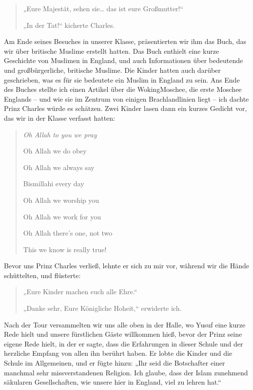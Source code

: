 \documentclass[12pt]{memoir}
\begin{document}
\begin{quote}
„Eure Majestät, sehen sie… das ist eure Großmutter!“

„In der Tat!“ kicherte Charles.
\end{quote}

Am Ende seines Besuches in unserer Klasse,
präsentierten wir ihm das Buch,
das wir über britische Muslime erstellt hatten.
Das Buch enthielt eine kurze Geschichte von Muslimen in England,
und auch Informationen über bedeutende und großbürgerliche, britische Muslime.
Die Kinder hatten auch darüber geschrieben,
was es für sie bedeutete ein Muslim in England zu sein.
Ans Ende des Buches stellte ich einen Artikel über die Woking\–Moschee,
die erste Moschee Englands –
und wie sie im Zentrum von einigen Brachlandlinien liegt –
ich dachte Prinz Charles würde es schätzen.
Zwei Kinder lasen dann ein kurzes Gedicht vor,
das wir in der Klasse verfasst hatten:

\begin{quote}
\itshape
Oh Allah to you we pray

Oh Allah we do obey

Oh Allah we always say

Bismillahi every day

Oh Allah we worship you

Oh Allah we work for you

Oh Allah there’s one, not two

This we know is really true!
\end{quote}

Bevor uns Prinz Charles verließ, lehnte er sich zu mir vor,
während wir die Hände schüttelten, und flüsterte:

\begin{quote}
„Eure Kinder machen euch alle Ehre.“

„Danke sehr, Eure Königliche Hoheit,“ erwiderte ich.
\end{quote}

Nach der Tour versammelten wir uns alle oben in der Halle,
wo Yusuf eine kurze Rede hielt und unsere fürstlichen Gäste willkommen hieß,
bevor der Prinz seine eigene Rede hielt,
in der er sagte, dass die Erfahrungen in dieser Schule
und der herzliche Empfang von allen ihn berührt haben.
Er lobte die Kinder und die Schule im Allgemeinen, und er fügte hinzu:
„Ihr seid die Botschafter einer manchmal sehr missverstandenen Religion.
Ich glaube, dass der Islam zunehmend säkularen Gesellschaften,
wie unsere hier in England, viel zu lehren hat.“
\end{document}
